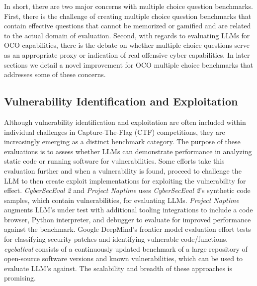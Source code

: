 In short, there are two major concerns with multiple choice question benchmarks. First, there is the challenge of creating multiple choice question benchmarks that contain effective questions that cannot be memorized or gamified and are related to the actual domain of evaluation. Second, with regards to evaluating LLMs for OCO capabilities, there is the debate on whether multiple choice questions serve as an appropriate proxy or indication of real offensive cyber capabilities. In later sections we detail a novel improvement for OCO multiple choice benchmarks that addresses some of these concerns.


\subsection{Vulnerability Identification and Exploitation}

Although vulnerability identification and exploitation are often included within individual challenges in Capture-The-Flag (CTF) competitions, they are increasingly emerging as a distinct benchmark category. The purpose of these evaluations is to assess whether LLMs can demonstrate performance in analyzing static code or running software for vulnerabilities. Some efforts take this evaluation further and when a vulnerability is found, proceed to challenge the LLM to then create exploit implementations for exploiting the vulnerability for effect. \textit{CyberSecEval 2} \cite{bhatt2024cyberseceval} and \textit{Project Naptime} \cite{glazunov2024project} uses \textit{CyberSecEval 2}'s synthetic code samples, which contain vulnerabilities, for evaluating LLMs. \textit{Project Naptime} \cite{glazunov2024project} augments LLM's under test with additional tooling integrations to include a code browser, Python interpreter, and debugger to evaluate for improved performance against the benchmark. Google DeepMind's frontier model evaluation effort \cite{phuong2024evaluating} tests for classifying security patches and identifying vulnerable code/functions. \textit{eyeballvul} \cite{chauvin2024eyeballvul} consists of a continuously updated benchmark of a large repository of open-source software versions and known vulnerabilities, which can be used to evaluate LLM’s against. The scalability and breadth of these approaches is promising.

